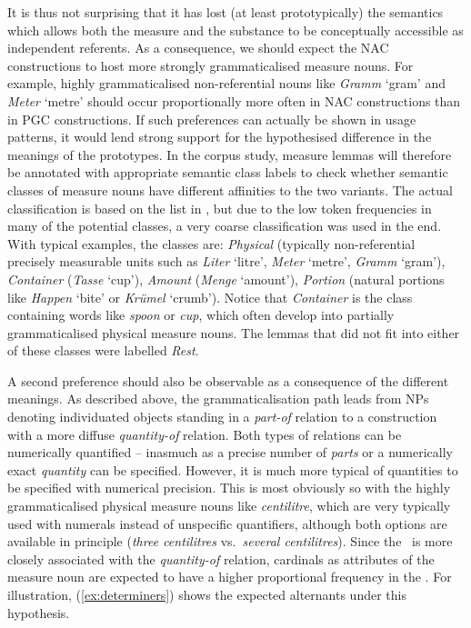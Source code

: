 It is thus not surprising that it has lost (at least prototypically) the semantics which allows both the measure and the substance to be conceptually accessible as independent referents.
As a consequence, we should expect the NAC constructions to host more strongly grammaticalised measure nouns.
For example, highly grammaticalised non-referential nouns like \textit{Gramm} `gram' and \textit{Meter} `metre' should occur proportionally more often in NAC constructions than in PGC constructions.
If such preferences can actually be shown in usage patterns, it would lend strong support for the hypothesised difference in the meanings of the prototypes.
In the corpus study, measure lemmas will therefore be annotated with appropriate semantic class labels to check whether semantic classes of measure nouns have different affinities to the two variants.
The actual classification is based on the list in \citet[530]{Koptjevskaja2001}, but due to the low token frequencies in many of the potential classes, a very coarse classification was used in the end.
With typical examples, the classes are:
\textit{Physical} (typically non-referential precisely measurable units such as \textit{Liter} `litre', \textit{Meter} `metre', \textit{Gramm} `gram'),
\textit{Container} (\textit{Tasse} `cup'),
\textit{Amount} (\textit{Menge} `amount'), 
\textit{Portion} (natural portions like \textit{Happen} `bite' or \textit{Krümel} `crumb').
Notice that \textit{Container} is the class containing words like \textit{spoon} or \textit{cup}, which often develop into partially grammaticalised physical measure nouns.
The lemmas that did not fit into either of these classes were labelled \textit{Rest}.

A second preference should also be observable as a consequence of the different meanings.
As described above, the grammaticalisation path leads from NPs denoting individuated objects standing in a \textit{part-of} relation to a construction with a more diffuse \textit{quantity-of} relation.
Both types of relations can be numerically quantified -- inasmuch as a precise number of \textit{parts} or a numerically exact \textit{quantity} can be specified.
However, it is much more typical of quantities to be specified with numerical precision.
This is most obviously so with the highly grammaticalised physical measure nouns like \textit{centilitre}, which are very typically used with numerals instead of unspecific quantifiers, although both options are available in principle (\textit{three centilitres} vs.\ \textit{several centilitres}).
Since the \NACa\ is more closely associated with the \textit{quantity-of} relation, cardinals as attributes of the measure noun are expected to have a higher proportional frequency in the \NACa.
For illustration, (\ref{ex:determiners}) shows the expected alternants under this hypothesis.

